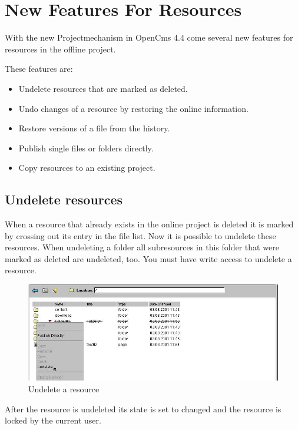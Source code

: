 \chapter{New Features For Resources}

With the new Projectmechanism in OpenCms 4.4 come several new
features for resources in the offline project.

These features are:
\begin{itemize}
\item Undelete resources that are marked as deleted.
\item Undo changes of a resource by restoring the online information.
\item Restore versions of a file from the history.
\item Publish single files or folders directly.
\item Copy resources to an existing project.
\end{itemize}

\newpage
\section{Undelete resources}
When a resource that already exists in the online
project is deleted it is marked by crossing out its entry in the
file list. Now it is possible to undelete these resources. When
undeleting a folder all subresources in this folder that were
marked as deleted are undeleted, too. You must have write access
to undelete a resource.

\begin{figure}[hbt]
\begin{center}
\includegraphics[width=\sgw]
                   {pics/newProject/undel03}
\caption[Undelete a resource]
           {Undelete a resource}
\label{undel}
\end{center}
\end{figure}

After the resource is undeleted its state is set to changed and
the resource is locked by the current user.

